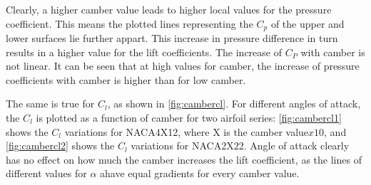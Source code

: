 Clearly, a higher camber value leads to higher local values for the pressure
coefficient. This means the plotted lines representing the $C_p$ of the upper
and lower surfaces lie further appart. This increase in pressure difference in
turn results in a higher value for the lift coefficients. The increase of $C_P$
with camber is not linear. It can be seen that at high values for camber, the
increase of pressure coefficients with camber is higher than for low camber.

The same is true for $C_l$, as shown in \autoref{fig:cambercl}. For different
angles of attack, the $C_l$ is plotted as a function of camber for two airfoil
series: \autoref{fig:cambercl1} shows the $C_l$ variations for NACA4X12, where X
is the camber value$x10$, and \autoref{fig:cambercl2} shows the $C_l$ variations
for NACA2X22. Angle of attack clearly has no effect on how much the camber
increases the lift coefficient, as the lines of different values for $\alpha$
ahave equal gradients for every camber value.

